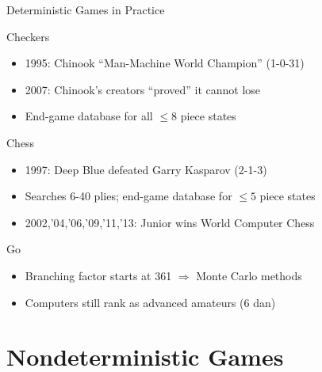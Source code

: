 \documentclass[14pt]{beamer}
\begin{document}
\begin{frame}{Deterministic Games in Practice}
	\begin{block}{Checkers}
		\begin{itemize}
			\item\small 1995: Chinook ``Man-Machine World Champion'' (1-0-31)
			\item\small 2007: Chinook's creators ``proved'' it cannot lose
			\item\small End-game database for all $\leq 8$ piece states
		\end{itemize}
	\end{block}
	\begin{block}{Chess}
		\begin{itemize}
			\item\small 1997: Deep Blue defeated Garry Kasparov (2-1-3)
			\item\small Searches 6-40 plies; end-game database for $\leq 5$ piece states
			\item\small 2002,'04,'06,'09,'11,'13: Junior wins World Computer Chess
		\end{itemize}
	\end{block}
	\begin{block}{Go}
		\begin{itemize}
			\item\small Branching factor starts at 361 $\Rightarrow$ Monte Carlo methods
			\item\small Computers still rank as advanced amateurs (6 dan)
		\end{itemize}
	\end{block}
\end{frame}

\section{Nondeterministic Games}
\end{document}
